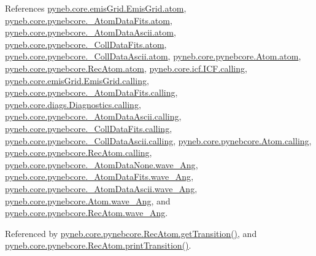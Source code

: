 References \hyperlink{emis_grid_8py_source_l00048}{pyneb.\+core.\+emis\+Grid.\+Emis\+Grid.\+atom}, \hyperlink{pynebcore_8py_source_l00082}{pyneb.\+core.\+pynebcore.\+\_\+\+Atom\+Data\+Fits.\+atom}, \hyperlink{pynebcore_8py_source_l00303}{pyneb.\+core.\+pynebcore.\+\_\+\+Atom\+Data\+Ascii.\+atom}, \hyperlink{pynebcore_8py_source_l00559}{pyneb.\+core.\+pynebcore.\+\_\+\+Coll\+Data\+Fits.\+atom}, \hyperlink{pynebcore_8py_source_l00909}{pyneb.\+core.\+pynebcore.\+\_\+\+Coll\+Data\+Ascii.\+atom}, \hyperlink{pynebcore_8py_source_l01164}{pyneb.\+core.\+pynebcore.\+Atom.\+atom}, \hyperlink{pynebcore_8py_source_l02564}{pyneb.\+core.\+pynebcore.\+Rec\+Atom.\+atom}, \hyperlink{icf_8py_source_l00016}{pyneb.\+core.\+icf.\+I\+C\+F.\+calling}, \hyperlink{emis_grid_8py_source_l00041}{pyneb.\+core.\+emis\+Grid.\+Emis\+Grid.\+calling}, \hyperlink{pynebcore_8py_source_l00090}{pyneb.\+core.\+pynebcore.\+\_\+\+Atom\+Data\+Fits.\+calling}, \hyperlink{diags_8py_source_l00169}{pyneb.\+core.\+diags.\+Diagnostics.\+calling}, \hyperlink{pynebcore_8py_source_l00311}{pyneb.\+core.\+pynebcore.\+\_\+\+Atom\+Data\+Ascii.\+calling}, \hyperlink{pynebcore_8py_source_l00568}{pyneb.\+core.\+pynebcore.\+\_\+\+Coll\+Data\+Fits.\+calling}, \hyperlink{pynebcore_8py_source_l00918}{pyneb.\+core.\+pynebcore.\+\_\+\+Coll\+Data\+Ascii.\+calling}, \hyperlink{pynebcore_8py_source_l01175}{pyneb.\+core.\+pynebcore.\+Atom.\+calling}, \hyperlink{pynebcore_8py_source_l02572}{pyneb.\+core.\+pynebcore.\+Rec\+Atom.\+calling}, \hyperlink{pynebcore_8py_source_l00057}{pyneb.\+core.\+pynebcore.\+\_\+\+Atom\+Data\+None.\+wave\+\_\+\+Ang}, \hyperlink{pynebcore_8py_source_l00165}{pyneb.\+core.\+pynebcore.\+\_\+\+Atom\+Data\+Fits.\+wave\+\_\+\+Ang}, \hyperlink{pynebcore_8py_source_l00426}{pyneb.\+core.\+pynebcore.\+\_\+\+Atom\+Data\+Ascii.\+wave\+\_\+\+Ang}, \hyperlink{pynebcore_8py_source_l01198}{pyneb.\+core.\+pynebcore.\+Atom.\+wave\+\_\+\+Ang}, and \hyperlink{pynebcore_8py_source_l02613}{pyneb.\+core.\+pynebcore.\+Rec\+Atom.\+wave\+\_\+\+Ang}.



Referenced by \hyperlink{pynebcore_8py_source_l02756}{pyneb.\+core.\+pynebcore.\+Rec\+Atom.\+get\+Transition()}, and \hyperlink{pynebcore_8py_source_l02775}{pyneb.\+core.\+pynebcore.\+Rec\+Atom.\+print\+Transition()}.


